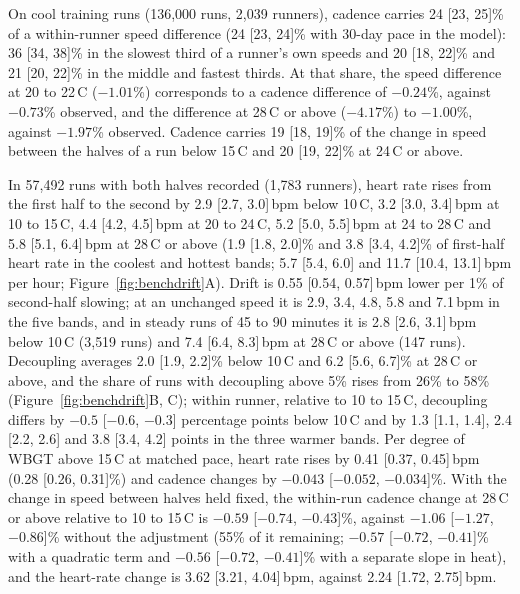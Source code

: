 \documentclass[11pt]{article}
\renewcommand{\_}{\textunderscore\allowbreak}
\begin{document}
On cool training runs (136{,}000 runs, 2{,}039 runners), cadence carries 24 [23, 25]\% of a within-runner speed difference (24 [23, 24]\% with 30-day pace in the model): 36 [34, 38]\% in the slowest third of a runner's own speeds and 20 [18, 22]\% and 21 [20, 22]\% in the middle and fastest thirds. At that share, the speed difference at 20 to 22\,\textdegree C ($-1.01$\%) corresponds to a cadence difference of $-0.24$\%, against $-0.73$\% observed, and the difference at 28\,\textdegree C or above ($-4.17$\%) to $-1.00$\%, against $-1.97$\% observed. Cadence carries 19 [18, 19]\% of the change in speed between the halves of a run below 15\,\textdegree C and 20 [19, 22]\% at 24\,\textdegree C or above.

In 57{,}492 runs with both halves recorded (1{,}783 runners), heart rate rises from the first half to the second by 2.9 [2.7, 3.0]\,bpm below 10\,\textdegree C, 3.2 [3.0, 3.4]\,bpm at 10 to 15\,\textdegree C, 4.4 [4.2, 4.5]\,bpm at 20 to 24\,\textdegree C, 5.2 [5.0, 5.5]\,bpm at 24 to 28\,\textdegree C and 5.8 [5.1, 6.4]\,bpm at 28\,\textdegree C or above (1.9 [1.8, 2.0]\% and 3.8 [3.4, 4.2]\% of first-half heart rate in the coolest and hottest bands; 5.7 [5.4, 6.0] and 11.7 [10.4, 13.1]\,bpm per hour; Figure~\ref{fig:benchdrift}A). Drift is 0.55 [0.54, 0.57]\,bpm lower per 1\% of second-half slowing; at an unchanged speed it is 2.9, 3.4, 4.8, 5.8 and 7.1\,bpm in the five bands, and in steady runs of 45 to 90 minutes it is 2.8 [2.6, 3.1]\,bpm below 10\,\textdegree C (3{,}519 runs) and 7.4 [6.4, 8.3]\,bpm at 28\,\textdegree C or above (147 runs). Decoupling averages 2.0 [1.9, 2.2]\% below 10\,\textdegree C and 6.2 [5.6, 6.7]\% at 28\,\textdegree C or above, and the share of runs with decoupling above 5\% rises from 26\% to 58\% (Figure~\ref{fig:benchdrift}B, C); within runner, relative to 10 to 15\,\textdegree C, decoupling differs by $-0.5$ [$-0.6$, $-0.3$] percentage points below 10\,\textdegree C and by 1.3 [1.1, 1.4], 2.4 [2.2, 2.6] and 3.8 [3.4, 4.2] points in the three warmer bands. Per degree of WBGT above 15\,\textdegree C at matched pace, heart rate rises by 0.41 [0.37, 0.45]\,bpm (0.28 [0.26, 0.31]\%) and cadence changes by $-0.043$ [$-0.052$, $-0.034$]\%. With the change in speed between halves held fixed, the within-run cadence change at 28\,\textdegree C or above relative to 10 to 15\,\textdegree C is $-0.59$ [$-0.74$, $-0.43$]\%, against $-1.06$ [$-1.27$, $-0.86$]\% without the adjustment (55\% of it remaining; $-0.57$ [$-0.72$, $-0.41$]\% with a quadratic term and $-0.56$ [$-0.72$, $-0.41$]\% with a separate slope in heat), and the heart-rate change is 3.62 [3.21, 4.04]\,bpm, against 2.24 [1.72, 2.75]\,bpm.
\end{document}
